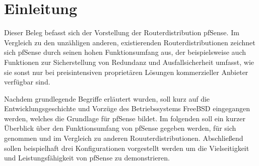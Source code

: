 \documentclass[a4paper,12pt]{scrartcl}
\begin{document}
\tableofcontents
\thispagestyle{empty}

\clearpage

\onehalfspacing

\pagestyle{headings}	%

\clearpage
\listoffigures

\clearpage
\section{Einleitung}
Dieser Beleg befasst sich der Vorstellung der Routerdistribution pfSense.
Im Vergleich zu den unzähligen anderen, existierenden Routerdistributionen
zeichnet sich pfSense durch seinen hohen Funktionsumfang aus, der beispielsweise
auch Funktionen zur Sicherstellung von Redundanz und Ausfallsicherheit umfasst,
wie sie sonst nur bei preisintensiven proprietären Lösungen kommerzieller
Anbieter verfügbar sind.



Nachdem grundlegende Begriffe erläutert wurden, soll kurz auf die
Entwicklungsgeschichte und Vorzüge des Betriebssystems FreeBSD eingegangen
werden, welches die Grundlage für pfSense bildet. Im folgenden soll ein kurzer
Überblick über den Funktionsumfang von pfSense gegeben werden, für sich genommen
und im Vergleich zu anderen Rouuterdistributionen. Abschließend sollen
beispielhaft drei Konfigurationen vorgestellt werden um die Vielseitigkeit und
Leistungsfähigkeit von pfSense zu demonstrieren.
\end{document}
